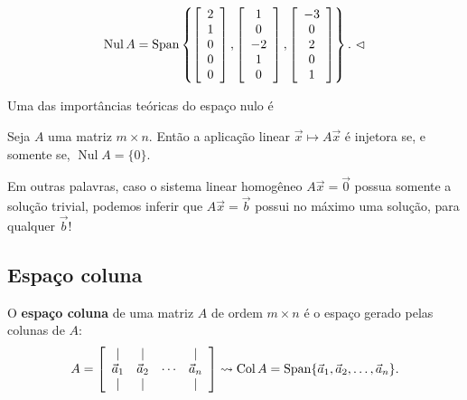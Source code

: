 \documentclass[../livro.tex]{subfiles}  %
\begin{document}
\begin{example}
\begin{equation}
	\operatorname{Nul} A = 
	\operatorname{Span} \left\{
	\left[
	\begin{array}{c}
	2 \\
	1 \\
	0 \\
	0 \\
	0 \\
	\end{array}
	\right],
	\left[
	\begin{array}{c}
	1 \\
	0 \\
	-2 \\
	1 \\
	0 \\
	\end{array}
	\right],
	\left[
	\begin{array}{c}
	-3 \\
	0 \\
	2 \\
	0 \\
	1 \\
	\end{array}
	\right]\right\}. \ \lhd
	\end{equation} 
\end{example}

Uma das importâncias teóricas do espaço nulo é

\begin{proposition}
	Seja $A$ uma matriz $m\times n$. Então a aplicação linear $\vec{x} \mapsto A \vec{x}$ é injetora se, e somente se, $\operatorname{Nul} A = \{ 0 \}.$
\end{proposition}

Em outras palavras, caso o sistema linear homogêneo $A \vec{x} = \vec{0}$ possua somente a solução trivial, podemos inferir que $A \vec{x} = \vec{b}$ possui no máximo uma solução, para qualquer $\vec{b}$!

\subsection{Espaço coluna}


O \textbf{espaço coluna} de uma matriz $A$ de ordem $m \times n$ é o espaço gerado pelas colunas de $A$:
\begin{equation}
A =
\left[
\begin{array}{cccc}
| & | &  & | \\
\vec{a}_1 & \vec{a}_2 & \cdots & \vec{a}_n \\
| & | &        & | \\
\end{array}
\right] \rightsquigarrow
\operatorname{Col} A = \operatorname{Span} \{ \vec{a}_1, \vec{a}_2, \dots, \vec{a}_n\}.
\end{equation}
\end{document}
